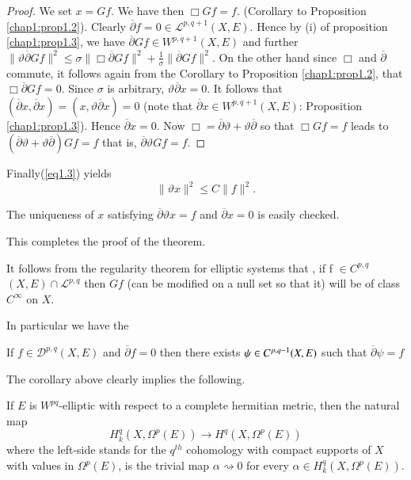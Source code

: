 \begin{proof}
  We set $x=Gf$. We have then $\Box  Gf=f$. (Corollary to Proposition
  \ref{chap1:prop1.2}). Clearly $\overline {\partial}f=0 \in
  \mathcal{L}^{p,{q+1}} (X, E)$. Hence by (i) of proposition
  \ref{chap1:prop1.3}, we have $ 
  \overline{\partial}Gf \in W^{p, q+1} (X,E)$ and further  
  $\| \vartheta \overline{\partial} Gf\|^2 \leqslant \sigma \|
  \Box  \overline {\partial} Gf\|^2 + \frac{1} {\sigma}\|
  \overline{\partial} Gf \|^2 $. On the other hand 
  since  $\Box$ and $\overline{\partial}$ commute, it follows again from
  the Corollary to Proposition \ref{chap1:prop1.2}, that $\Box \overline{\partial}
  Gf=0$. Since $\sigma$ 
  is arbitrary, $\vartheta \overline {\partial}x=0$. It follows that
  $(\overline {\partial}x, \overline {\partial}x)= (x,\vartheta
  \overline{\partial } x)=0$ (note that  $\overline{\partial}x \in
  W^{p,{q+1}}(X,E)$: Proposition \ref{chap1:prop1.3}). Hence $\overline{\partial}
  x=0$. Now $\Box = \overline{\partial} \vartheta + \vartheta \overline
  {\partial}$ so that $\Box Gf=f$ leads to 
  $(\overline{\partial} \vartheta + \vartheta \overline{\partial}) 
  Gf=f$ that is, $\overline {\partial} \vartheta Gf=f$. 
\end{proof}

Finally\pageoriginale (\ref{eq1.3}) yields
$$ 
\| \vartheta x \|^{2}\leqslant C \| f\|^{2}.
$$

The uniqueness of $x$ satisfying $\overline {\partial} \vartheta x=f$
and $\overline{\partial}x=0$ is easily checked. 

This completes the proof of the theorem.

It follows from the regularity theorem for elliptic systems that , if f
$\in  C^{p,q}$ $(X,E) \cap \mathcal{L}^{p,q} $ then $Gf$ (can be
modified on a null set so that it) will be of class $C^{\infty}$ on $X$.

In particular we have the 

\begin{coro*}
  If $f \in \mathcal{D}^{p,q} (X,E)$ and $\overline {\partial}
  f=0$ then there exists $\psi  \in C^{p,{q-1}}\break (X,E)$ such that $
  \overline{\partial} \psi =f$  
\end{coro*}

\begin{remark*}
  The corollary above clearly implies the following.
\end{remark*}

If $E$ is $W^{pq}$-elliptic with respect to a complete hermitian
metric, then the natural map 
$$
H^q_k (X,\Omega^p (E))\rightarrow H^q(X, \Omega^p(E))
$$
where the  left-side stands for the $q^{th}$ cohomology with compact
supports of $X$ with values in $\Omega^p(E)$, is the trivial map $\alpha
\rightsquigarrow 0$ for every $\alpha \in H^q_k (X,
\Omega^p  (E))$. 

